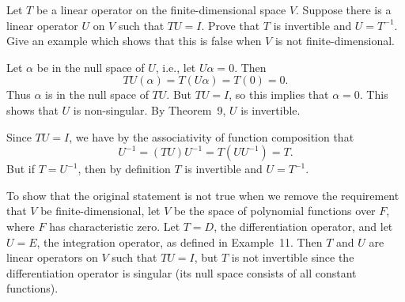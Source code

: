  Let $T$ be a linear operator on the finite-dimensional
space $V$. Suppose there is a linear operator $U$ on $V$ such that
$TU = I$. Prove that $T$ is invertible and $U = T^{-1}$. Give an
example which shows that this is false when $V$ is not
finite-dimensional.
\begin{solution}
  Let $\alpha$ be in the null space of $U$, i.e., let $U\alpha =
  0$. Then
  \begin{equation*}
    TU(\alpha) = T(U\alpha) = T(0) = 0.
  \end{equation*}
  Thus $\alpha$ is in the null space of $TU$. But $TU = I$, so this
  implies that $\alpha = 0$. This shows that $U$ is non-singular. By
  Theorem~9, $U$ is invertible.

  Since $TU = I$, we have by the associativity of function composition
  that
  \begin{equation*}
    U^{-1} = (TU)U^{-1} = T(UU^{-1}) = T.
  \end{equation*}
  But if $T = U^{-1}$, then by definition $T$ is invertible and
  $U = T^{-1}$.

  To show that the original statement is not true when we remove the
  requirement that $V$ be finite-dimensional, let $V$ be the space of
  polynomial functions over $F$, where $F$ has characteristic
  zero. Let $T = D$, the differentiation operator, and let $U = E$,
  the integration operator, as defined in Example~11. Then $T$ and $U$
  are linear operators on $V$ such that $TU = I$, but $T$ is not
  invertible since the differentiation operator is singular (its null
  space consists of all constant functions).
\end{solution}

